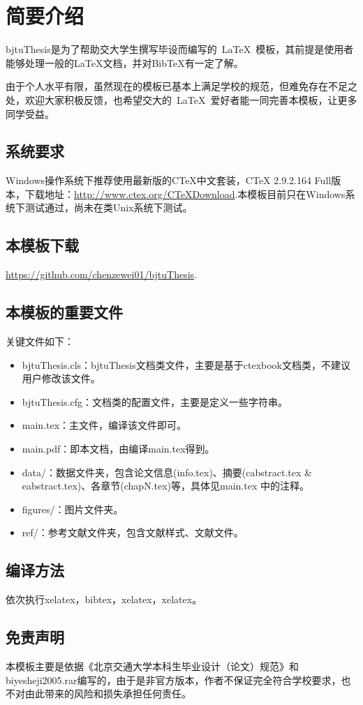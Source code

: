 \chapter{简要介绍}
bjtuThesis是为了帮助交大学生撰写毕设而编写的~\LaTeX{}~模板，其前提是使用者能够处理一般的LaTeX文档，并对BibTeX有一定了解。\par
由于个人水平有限，虽然现在的模板已基本上满足学校的规范，但难免存在不足之处，欢迎大家积极反馈，也希望交大的~\LaTeX{}~爱好者能一同完善本模板，让更多同学受益。
\section{系统要求}
Windows操作系统下推荐使用最新版的CTeX中文套装，CTeX 2.9.2.164 Full版本，下载地址：\url{http://www.ctex.org/CTeXDownload}.本模板目前只在Windows系统下测试通过，尚未在类Unix系统下测试。
\section{本模板下载}
\url{https://github.com/chenzewei01/bjtuThesis}.
\section{本模板的重要文件}
关键文件如下：
\begin{itemize}
  \item bjtuThesis.cls：bjtuThesis文档类文件，主要是基于ctexbook文档类，不建议用户修改该文件。
  \item bjtuThesis.cfg：文档类的配置文件，主要是定义一些字符串。
  \item main.tex：主文件，编译该文件即可。
  \item main.pdf：即本文档，由编译main.tex得到。
  \item data/：数据文件夹，包含论文信息(info.tex)、摘要(cabstract.tex \& eabstract.tex)、各章节(chapN.tex)等，具体见main.tex 中的注释。
  \item figures/：图片文件夹。
  \item ref/：参考文献文件夹，包含文献样式、文献文件。
\end{itemize}
\section{编译方法}
依次执行xelatex，bibtex，xelatex，xelatex。
\section{免责声明}
本模板主要是依据《北京交通大学本科生毕业设计（论文）规范》和biyesheji2005.rar编写的，由于是非官方版本，作者不保证完全符合学校要求，也不对由此带来的风险和损失承担任何责任。
